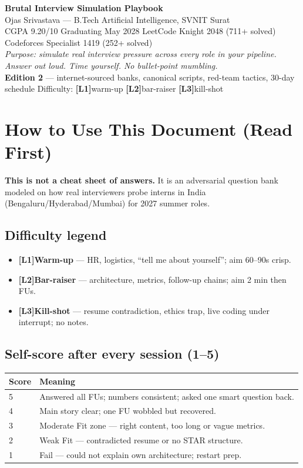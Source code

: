 \documentclass[9pt,a4paper]{article}
\newcommand{\diffLone}{\textcolor{green!50!black}{\textbf{[L1]}}}
\newcommand{\diffLtwo}{\textcolor{orange!90!black}{\textbf{[L2]}}}
\newcommand{\diffLthree}{\textcolor{brutal}{\textbf{[L3]}}}
\begin{document}
\begin{center}
{\LARGE\bfseries Brutal Interview Simulation Playbook}\\[4pt]
{\large Ojas Srivastava --- B.Tech Artificial Intelligence, SVNIT Surat}\\[2pt]
{\small CGPA 9.20/10 \textbar{} Graduating May 2028 \textbar{} LeetCode Knight 2048 (711+ solved) \textbar{} Codeforces Specialist 1419 (252+ solved)}\\[6pt]
{\color{hint}\textit{Purpose: simulate real interview pressure across every role in your pipeline. Answer out loud. Time yourself. No bullet-point mumbling.}}\\[4pt]
{\small \textbf{Edition 2} --- internet-sourced banks, canonical scripts, red-team tactics, 30-day schedule \textbar{} Difficulty: \diffLone warm-up \diffLtwo bar-raiser \diffLthree kill-shot}
\end{center}

\tableofcontents
\newpage

\section{How to Use This Document (Read First)}
\textbf{This is not a cheat sheet of answers.} It is an adversarial question bank modeled on how real interviewers probe interns in India (Bengaluru/Hyderabad/Mumbai) for 2027 summer roles.

\subsection{Difficulty legend}
\begin{itemize}
  \item \diffLone \textbf{Warm-up} --- HR, logistics, ``tell me about yourself''; aim 60--90s crisp.
  \item \diffLtwo \textbf{Bar-raiser} --- architecture, metrics, follow-up chains; aim 2 min then FUs.
  \item \diffLthree \textbf{Kill-shot} --- resume contradiction, ethics trap, live coding under interrupt; no notes.
\end{itemize}

\subsection{Self-score after every session (1--5)}
\begin{tabularx}{\textwidth}{@{}lX@{}}
\toprule
\textbf{Score} & \textbf{Meaning} \\
\midrule
5 & Answered all FUs; numbers consistent; asked one smart question back. \\
4 & Main story clear; one FU wobbled but recovered. \\
3 & Moderate Fit zone --- right content, too long or vague metrics. \\
2 & Weak Fit --- contradicted resume or no STAR structure. \\
1 & Fail --- could not explain own architecture; restart prep. \\
\bottomrule
\end{tabularx}
\end{document}
